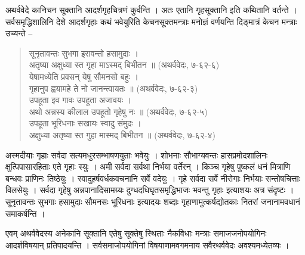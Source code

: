 अथर्ववेदे कानिचन सूक्तानि आदर्शगृहचित्रणं कुर्वन्ति । अतः एतानि गृहसूक्तानि इति कथितानि वर्तन्ते । सर्वसमृद्धिशालिनि देशे आदर्शगृहाः कथं भवेयुरिति केचनसूक्तमन्त्राः मनोज्ञं वर्णयन्ति दिङ्मात्रं केचन मन्त्राः उच्यन्ते –
\begin{verse}
सूनृतावन्तः सुभगा इरावन्तो हसामुदाः ।\\
अतृष्या अक्षुध्या स्त गृहा माऽस्मद् बिभीतन ॥ (अथर्ववेदः, ७-६२-६)\\
येषामध्येति प्रवसन् येषु सौमनसो बहुः ।\\
गृहानुप ह्वयामहे ते नो जानन्त्वायतः ॥ (अथर्ववेदः, ७-६२-३)\\
उपहूता इव गावः उपहूता अजावयः ।\\
अथो अन्नस्य कीलाल उपहूतो गृहेषु नः ॥ (अथर्ववेदः, ७-६२-५)\\
उपहूता भूरिधनाः सखायः स्वादु संमुदः ।\\
अक्षुध्या अतृष्या स्त गुहा मास्मद् बिभीतन ॥ (अथर्ववेदः, ७-६२-४)
\end{verse}
अस्मदीयाः गृहाः सर्वदा सत्यमधुरसम्भाषणयुताः भवेयुः । शोभनाः सौभाग्यवन्तः हासप्रमोदशालिनः क्षुत्पिपासारहिताः एते गृहाः स्युः । अमी सर्वदा सर्वथा निर्भया वर्तेरन् । किञ्च गृहेषु पुष्कलं धनं मित्राणि बन्धवः प्राणिनः तिष्ठेयुः । स्वादुहर्षवर्धकवचनानि सर्वे वदेयुः । गृहे सर्वदा सर्वे नीरोगाः निर्भयाः सन्तोषचित्ताः विलसेयुः । सर्वदा गृहेषु अन्नपानादिसामग्र्यः दुग्धदधिघृतसमृद्धिभाजः भवन्तु गृहाः इत्याशयः अत्र संदृष्टः । सूनृतावन्तः सुभगाः हसामुदाः सौमनसः भूरिधनाः इत्यादयः शब्दाः गृहाणामुत्कर्षद्योतकाः नितरां जनानामवधानं समाकर्षन्ति ।

एवम् अथर्ववेदस्य अनेकानि सूक्तानि एतेषु सूक्तेषु स्थिताः नैकविधाः मन्त्राः समाजजनोपयोगिनः आदर्शविषयान् प्रतिपादयन्ति । सर्वसमाजोपयोगिनां विषयाणामवगमनाय सवैरथर्ववेदः अवश्यमध्येतव्यः ।
